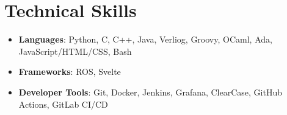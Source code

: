\documentclass[letterpaper,10pt]{article}
\newcommand{\itemsBegin}{
    \begin{itemize}[leftmargin=0.2in, labelsep=0.05in, itemsep=0pt, parsep=1pt, topsep=0pt, partopsep=0pt]
}
\newcommand{\itemsEnd}{\end{itemize}}
\begin{document}
\section{Technical Skills}

    \itemsBegin{}
        \item \textbf{Languages}{: Python, C, C++, Java, Verliog, Groovy, OCaml, Ada, JavaScript/HTML/CSS, Bash}
        \item \textbf{Frameworks}{: ROS, Svelte}
        \item \textbf{Developer Tools}{: Git, Docker, Jenkins, Grafana, ClearCase, GitHub Actions, GitLab CI/CD }
    \itemsEnd{}
\end{document}

